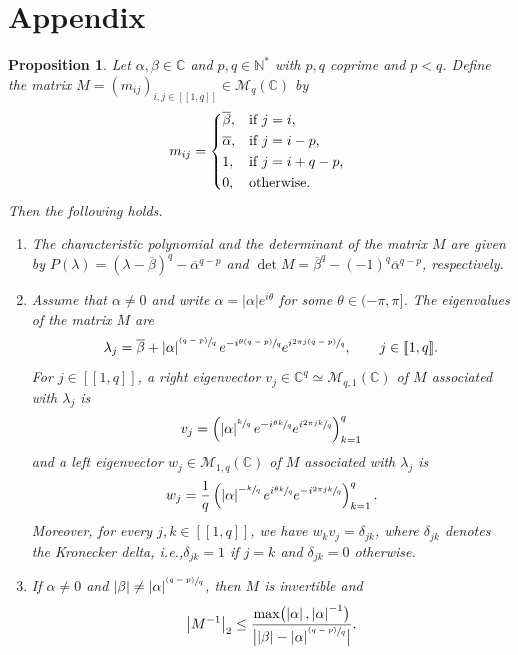 \documentclass[10pt]{article}
\newcommand{\ie}{i.e.,\xspace}
\newcommand{\psfrac}[2]{\sfrac{(#1)}{#2}}
\newcommand{\llbracket}{[\![}
\newcommand{\rrbracket}{]\!]}
\theoremstyle{plain}
\newtheorem{prop}[theo]{Proposition}
\theoremstyle{definition}
\newcommand{\abs}[1]{\left\lvert #1\right \rvert}
\newcommand{\babs}[1]{\bigl\lvert #1\bigr \rvert}
\numberwithin{equation}{section}\numberwithin{figure}{section}\emergencystretch=3em
\begin{document}
\appendix

\section*{Appendix}
\label{AppM}

\begin{prop}
\label{AppPropM}
Let $\alpha, \beta \in \mathbb C$ and $p, q \in \mathbb N^\ast$ with $p, q$ coprime and $p < q$. Define the matrix $M = (m_{ij})_{i, j \in \llbracket 1, q\rrbracket} \in \mathcal M_{q}(\mathbb C)$ by
\begin{equation}
\label{DefMij}
m_{ij} =
\begin{dcases*}
\overline\beta, & if $j = i$, \\
\overline\alpha, & if $j = i - p$, \\
1, & if $j = i + q - p$, \\
0, & otherwise.
\end{dcases*}
\end{equation}
Then the following holds.

\begin{enumerate}
\item\label{AppCharactPolyM} The characteristic polynomial and the determinant of the matrix $M$ are given by $P(\lambda) = \left(\lambda - \overline\beta\right)^q - \overline\alpha^{q - p}$ and $\det M = \overline\beta^q - (-1)^q \overline\alpha^{q - p}$, respectively.

\item\label{AppEigenvectorsM} Assume that $\alpha \neq 0$ and write $\alpha = \abs{\alpha} e^{i\theta}$ for some $\theta \in (-\pi, \pi]$. The eigenvalues of the matrix $M$ are
\begin{equation}
\label{EigenvaluesM}
\lambda_j = \overline\beta + \abs{\alpha}^{\psfrac{q - p}{q}} e^{-i\sfrac{\theta(q - p)}{q}} e^{i \sfrac{2\pi j (q - p)}{q}}, \qquad j \in \llbracket 1, q\rrbracket.
\end{equation}
For $j \in \llbracket 1, q\rrbracket$, a right eigenvector $v_j \in \mathbb C^q \simeq \mathcal M_{q, 1}(\mathbb C)$ of $M$ associated with $\lambda_j$ is
\[
v_j = \left(\abs{\alpha}^{\sfrac{k}{q}} e^{-i \sfrac{\theta k}{q}} e^{i \sfrac{2\pi j k}{q}}\right)_{k=1}^q
\]
and a left eigenvector $w_j \in \mathcal M_{1, q}(\mathbb C)$ of $M$ associated with $\lambda_j$ is
\[
w_j = \frac{1}{q} \left(\abs{\alpha}^{-\sfrac{k}{q}} e^{i \sfrac{\theta k}{q}} e^{-i \sfrac{2\pi j k}{q}}\right)_{k=1}^q.
\]
Moreover, for every $j, k \in \llbracket 1, q\rrbracket$, we have $w_k v_j = \delta_{jk}$, where $\delta_{jk}$ denotes the Kronecker delta, \ie $\delta_{jk} = 1$ if $j = k$ and $\delta_{jk} = 0$ otherwise.

\item\label{AppInverseM} If $\alpha \neq 0$ and $\abs{\beta} \neq \abs{\alpha}^{\psfrac{q - p}{q}}$, then $M$ is invertible and
\[\abs{M^{-1}}_{2} \leq \frac{\max\bigl(\abs{\alpha}, \abs{\alpha}^{-1}\bigr)}{\babs{\abs{\beta} - \abs{\alpha}^{\psfrac{q - p}{q}}}}.\]
\end{enumerate}
\end{prop}
\end{document}
